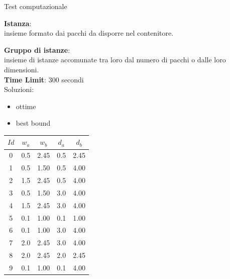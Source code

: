 \documentclass{beamer}
\begin{document}
\begin{frame}{Test computazionale}
	\begin{minipage}[c]{0.45\textwidth}
		\textbf{Istanza}:\\ insieme formato dai pacchi da disporre nel contenitore.
		\vspace{.5cm}
						
		\textbf{Gruppo di istanze}:\\ insieme di istanze accomunate tra loro dal numero di pacchi o dalle loro dimensioni.\\
						
		\textbf{Time Limit}: 300 secondi\\
						
		Soluzioni:
		\begin{itemize}
			\item ottime
			\item best bound
		\end{itemize}
	\end{minipage}
	\hfill
	\begin{minipage}[c]{0.45\textwidth}
		\begin{center}
			\begin{tabular}{c|c|c|c|c}
				$Id$ & $w_a$ & $w_b$ & $d_a$ & $d_b$ \\
				\hline	
				0  & 0.5   & 2.45  & 0.5   & 2.45  \\
				1  & 0.5   & 1.50  & 0.5   & 4.00  \\
				2  & 1.5   & 2.45  & 0.5   & 4.00  \\
				3  & 0.5   & 1.50  & 3.0   & 4.00  \\
				4  & 1.5   & 2.45  & 3.0   & 4.00  \\
				5  & 0.1   & 1.00  & 0.1   & 1.00  \\
				6  & 0.1   & 1.00  & 3.0   & 4.00  \\
				7  & 2.0   & 2.45  & 3.0   & 4.00  \\
				8  & 2.0   & 2.45  & 2.0   & 2.45  \\
				9  & 0.1   & 1.00  & 0.1   & 4.00  \\
			\end{tabular}
		\end{center}
	\end{minipage}
\end{frame}
\end{document}
